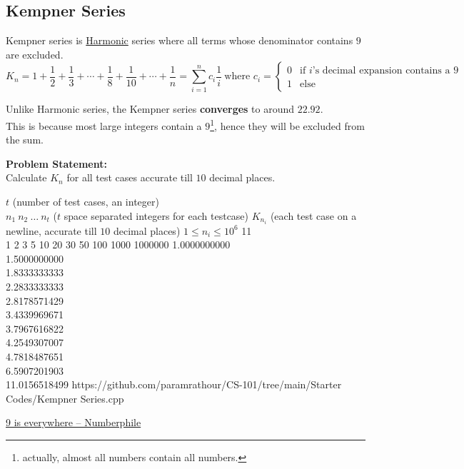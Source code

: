 \documentclass[../../Problems]{subfiles}
\begin{document}
\subsection{Kempner Series}
Kempner series is \hyperref[pp:harmonic]{Harmonic} series where all terms whose denominator contains $9$ are excluded.
\begin{equation}
{K_{n}=1+{\frac {1}{2}}+{\frac {1}{3}}+\cdots+{\frac {1}{8}}+{\frac {1}{10}}+\cdots +{\frac {1}{n}}=\sum _{i=1}^{n}c_i{\frac {1}{i}}} \ \text{where } c_i = \begin{cases} 
      0 & \text{if $i$'s decimal expansion contains a }9\\
      1 & \text{else}
   \end{cases}
\end{equation}
\begin{fact}
Unlike Harmonic series, the Kempner series \textbf{converges} to around $22.92$.\\This is because most large integers contain a $9$\footnote{actually, almost all numbers contain all numbers.}, hence they will be excluded from the sum.
\end{fact}
\textbf{Problem Statement:}\\
Calculate $K_n$ for all test cases accurate till $10$ decimal places.
\begin{testcases}
	{$t$ \hfill(number of test cases, an integer)\\
	$n_1\ n_2\ \ldots\ n_t$ \hfill($t$ space separated integers for each testcase)}
	{$K_{n_i}$ \hfill(each test case on a newline, accurate till $10$ decimal places)}
	{$1 \leq n_i \leq 10^{6}$}
	{11\\1 2 3 5 10 20 30 50 100 1000 1000000}
	{1.0000000000\\1.5000000000\\1.8333333333\\2.2833333333\\2.8178571429\\3.4339969671\\3.7967616822\\4.2549307007\\4.7818487651\\6.5907201903\\11.0156518499}
	{https://github.com/paramrathour/CS-101/tree/main/Starter Codes/Kempner Series.cpp}
\end{testcases}
\begin{funvideo}
\href{https://youtu.be/UfEiJJGv4CE}{9 is everywhere -- Numberphile}
\end{funvideo}
\end{document}
